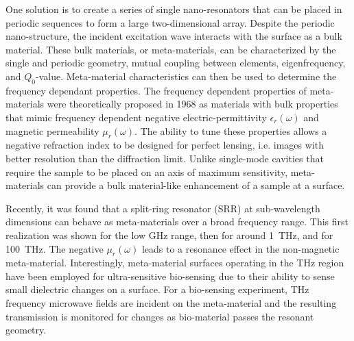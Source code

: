 One solution is to create a series of single nano-resonators that can be placed in periodic sequences to form a large two-dimensional array. Despite the periodic nano-structure, the incident excitation wave interacts with the surface as a bulk material. \cite{Yen04} These bulk materials, or meta-materials, can be characterized by the single and periodic geometry, mutual coupling between elements, eigenfrequency, and $Q_0$-value. Meta-material characteristics can then be used to determine the frequency dependant properties. The frequency dependent properties of meta-materials were theoretically proposed in 1968 as materials with bulk properties that mimic frequency dependent negative electric-permittivity $\epsilon_r(\omega)$ and magnetic permeability $\mu_r(\omega)$. \cite{Veselago68} The ability to tune these properties allows a negative refraction index to be designed for perfect lensing, i.e. images with better resolution than the diffraction limit. \cite{Smith04} Unlike single-mode cavities that require the sample to be placed on an axis of maximum sensitivity, meta-materials can provide a bulk material-like enhancement of a sample at a surface.

Recently, it was found that a split-ring resonator (SRR) at sub-wavelength dimensions can behave as meta-materials over a broad frequency range. \cite{Smith00,Yen04,Linden04} This first realization was shown for the low GHz range, \cite{Smith00} then for around 1~THz, \cite{Yen04} and for 100~THz. \cite{Linden04} The negative $\mu_r(\omega)$ leads to a resonance effect in the non-magnetic meta-material. Interestingly, meta-material surfaces operating in the THz region have been employed for ultra-sensitive bio-sensing due to their ability to sense small dielectric changes on a surface. \cite{C7NR03824K} For a bio-sensing experiment, THz frequency microwave fields are incident on the meta-material and the resulting transmission is monitored for changes as bio-material passes the resonant geometry. \cite{Lee2017}

